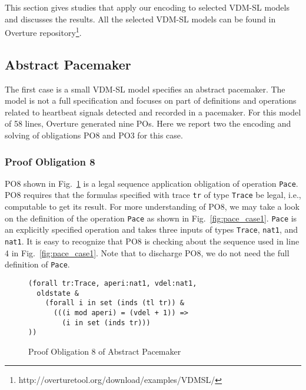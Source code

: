 This section gives studies that apply our encoding to selected VDM-SL models and discusses the results. All the selected VDM-SL models can be found in Overture repository\footnote{http://overturetool.org/download/examples/VDMSL/}.

\subsection{Abstract Pacemaker}
\label{section:case1}

The first case is a small VDM-SL model specifies an abstract pacemaker. The model is not a full specification and focuses on part of definitions and operations related to heartbeat signals detected and recorded in a pacemaker. For this model of 58 lines, Overture generated nine POs. Here we report two the encoding and solving of obligations PO8 and PO3 for this case.

\subsubsection{Proof Obligation 8}

PO8 shown in Fig.~\ref{fig:po8_case1} is a legal sequence application obligation of operation {\tt Pace}.  PO8 requires that the formulas specified with trace {\tt tr} of type {\tt Trace} be legal, i.e., computable to get its result. For more understanding of PO8, we may take a look on the definition of the operation {\tt Pace} as shown in Fig.~\ref{fig:pace_case1}. {\tt Pace} is an explicitly specified operation and takes three inputs of types {\tt Trace}, {\tt nat1}, and {\tt nat1}. It is easy to recognize that PO8 is checking about the sequence used in line 4 in Fig.~\ref{fig:pace_case1}. Note that to discharge PO8, we do not need the full definition of {\tt Pace}.

\begin{figure}[t]
\begin{center}
\begin{mdframed}[roundcorner=5pt]
\begin{Verbatim}[fontsize=\small]
(forall tr:Trace, aperi:nat1, vdel:nat1,
  oldstate & 
    (forall i in set (inds (tl tr)) &
      (((i mod aperi) = (vdel + 1)) =>
        (i in set (inds tr)))
))
\end{Verbatim}
\end{mdframed}
\vspace{-10pt}
\caption{Proof Obligation 8 of Abstract Pacemaker}
\label{fig:po8_case1}
\end{center}
\end{figure}

